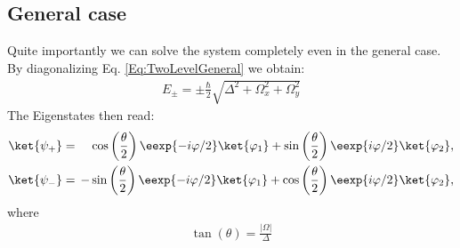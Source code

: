 \subsection{General case}

Quite importantly we can solve the system completely even in the general case. By diagonalizing  Eq. \eqref{Eq:TwoLevelGeneral} we obtain:
\begin{align}\label{eq:Epm}
 E_\pm = \pm \frac{\hbar}{2} \sqrt{\Delta^2+\Omega_x^2+\Omega_y^2}
\end{align}
The Eigenstates then read:
\begin{align}
				\ket{\psi_+}&=&\hspace{-2mm}&\cos\left(\frac{\theta}{2}\right) \eexp{-i{\varphi}/{2}}\ket{\varphi_1}+\sin\left(\frac{\theta}{2}\right) \eexp{i{\varphi}/{2}}\ket{\varphi_2}, \label{eq:staticpsiplus} \\ 
				\ket{\psi_-}&=&\hspace{-2mm}-&\sin\left(\frac{\theta}{2}\right) \eexp{-i{\varphi}/{2}}\ket{\varphi_1}+\cos\left(\frac{\theta}{2}\right) \eexp{i{\varphi}/{2}}\ket{\varphi_2}, \label{eq:staticpsiminus}
\end{align}
where 
\begin{align} \label{eq:parameters}
	\tan(\theta) = \frac{|\Omega|}{\Delta} 
\end{align}